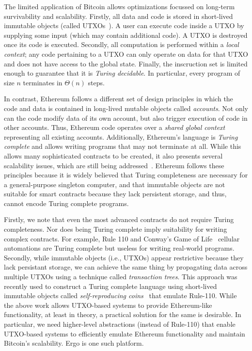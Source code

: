 \documentclass[runningheads]{llncs}
\begin{document}
The limited application of Bitcoin allows optimizations focussed on long-term survivability and scalability. Firstly, all data and code is stored in short-lived immutable objects (called UTXOs~\cite{utxo}). A user can execute code inside a UTXO by supplying some input (which may contain additional code). A UTXO is destroyed once its code is executed. Secondly, all computation is performed within a {\em local context}; any code pertaining to a UTXO can only operate on data for that UTXO and does not have access to the global state. Finally, the inscruction set is limited enough to guarantee that it is {\em Turing decidable}. In particular, every program of size $n$ terminates in $\Theta(n)$ steps. 


In contrast, Ethereum follows a different set of design principles in which the code and data is contained in long-lived mutable objects called {\em accounts}. Not only can the code modify data of its own account, but also trigger execution of code in other accounts. Thus, Ethereum code operates over a {\em shared global context} representing all existing accounts. Additionally, Ethereum's language is {\em Turing complete} and allows writing programs that may not terminate at all. While this allows many sophisticated contracts to be created, it also presents several scalability issues, which are still being addressed~\cite{Luu:2016:MSC:2976749.2978309}. Ethereum follows these principles because it is widely believed that Turing completeness are necessary for a general-purpose singleton computer, and that immutable objects are not suitable for smart contracts because they lack persistent storage, and thus, cannot encode Turing complete programs. 

Firstly, we note that even the most advanced contracts do not require Turing completeness. Nor does being Turing complete imply suitability for writing complex contracts. For example, Rule 110 \cite{Cook_2009,neary2006p} and Conway's Game of Life~\cite{rendell2014turing} cellular automations are Turing complete but useless for writing real-world programs. 
Secondly, while immutable objects (i.e., UTXOs) appear restrictive because they lack persistant storage, we can achieve the same thing by propagating data across multiple UTXOs using a technique called {\em transaction trees}. This approach was recently used to construct a Turing complete language using short-lived immutable objects called {\em self-reproducing coins}~\cite{CKM18a} that emulate Rule-110. 
While the above work allows UTXO-based systems to provide Ethereum-like functionality, at least in theory, a practical solution for the same is desirable. In particular, we need higher-level abstractions (instead of Rule-110) that enable UTXO-based systems to efficiently emulate Ethereum functionality and maintain Bitcoin's scalability. Ergo is one such platform.
\end{document}
